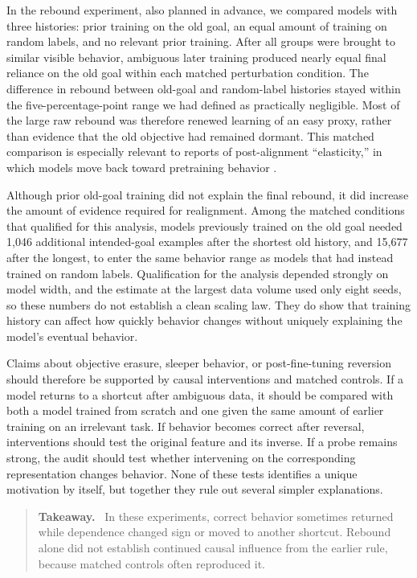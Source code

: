 \documentclass[11pt,a4paper]{article}
\newenvironment{takeaway}{%
  \begin{quote}\small\color{ink}\noindent\textbf{Takeaway.}\ 
}{%
  \end{quote}
}
\begin{document}
In the rebound experiment, also planned in advance, we compared models with three histories: prior training on the old goal, an equal amount of training on random labels, and no relevant prior training. After all groups were brought to similar visible behavior, ambiguous later training produced nearly equal final reliance on the old goal within each matched perturbation condition. The difference in rebound between old-goal and random-label histories stayed within the five-percentage-point range we had defined as practically negligible. Most of the large raw rebound was therefore renewed learning of an easy proxy, rather than evidence that the old objective had remained dormant. This matched comparison is especially relevant to reports of post-alignment ``elasticity,'' in which models move back toward pretraining behavior \citep{ji2025alignment}.

Although prior old-goal training did not explain the final rebound, it did increase the amount of evidence required for realignment. Among the matched conditions that qualified for this analysis, models previously trained on the old goal needed 1,046 additional intended-goal examples after the shortest old history, and 15,677 after the longest, to enter the same behavior range as models that had instead trained on random labels. Qualification for the analysis depended strongly on model width, and the estimate at the largest data volume used only eight seeds, so these numbers do not establish a clean scaling law. They do show that training history can affect how quickly behavior changes without uniquely explaining the model's eventual behavior.

Claims about objective erasure, sleeper behavior, or post-fine-tuning reversion should therefore be supported by causal interventions and matched controls. If a model returns to a shortcut after ambiguous data, it should be compared with both a model trained from scratch and one given the same amount of earlier training on an irrelevant task. If behavior becomes correct after reversal, interventions should test the original feature and its inverse. If a probe remains strong, the audit should test whether intervening on the corresponding representation changes behavior. None of these tests identifies a unique motivation by itself, but together they rule out several simpler explanations.

\begin{takeaway}
In these experiments, correct behavior sometimes returned while dependence changed sign or moved to another shortcut. Rebound alone did not establish continued causal influence from the earlier rule, because matched controls often reproduced it.
\end{takeaway}
\end{document}
